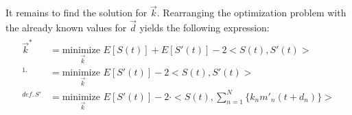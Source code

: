 \documentclass[11pt]{scrartcl} %
\begin{document}
  It remains to find the solution for \(\vec{k}\). Rearranging the optimization problem with the already known values for \(\vec{d}\) yields the following expression:
  \begin{align*}
    \begin{aligned}
      \vec{k}^* &= \underset{\vec{k}}{\text{minimize }} E[S{\scriptstyle (t)}] + E[S'{\scriptstyle (t)}] - 2<S{\scriptstyle (t)}, S'{\scriptstyle (t)}>\\
      ^{1.}&= \underset{\vec{k}}{\text{minimize }} E[S'{\scriptstyle (t)}] - 2<S{\scriptstyle (t)}, S'{\scriptstyle (t)}>\\
      ^{def.\,S'}&= \underset{\vec{k}}{\text{minimize }} E[S'{\scriptstyle (t)}] - 2\cdot <S{\scriptstyle (t)},\sum_{n=1}^N\{k_nm'_n{\scriptstyle (t+d_n)}\}>\\
      \end{aligned}
  \end{align*}

  
  
\end{document}
